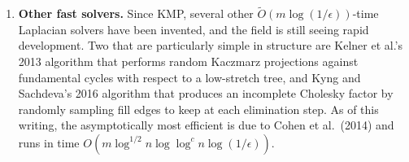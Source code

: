 \documentclass[11pt]{article}
\begin{document}
\begin{enumerate}
\item {\bf Other fast solvers.}
Since KMP, several other $\tilde{O}(m\log(1/\epsilon))$-time
Laplacian solvers have been invented, 
and the field is still seeing rapid development.
Two that are particularly simple in structure are
Kelner et al.'s 2013 algorithm that performs random Kaczmarz 
projections against fundamental cycles with respect to a
low-stretch tree,
and Kyng and Sachdeva's 2016 algorithm that produces an
incomplete Cholesky factor by randomly sampling fill edges
to keep at each elimination step.
As of this writing, the asymptotically most efficient
is due to Cohen et al.\ (2014) 
and runs in time $O(m\log^{1/2}n\log\log^c n\log(1/\epsilon))$.

\end{enumerate}
\end{document}
